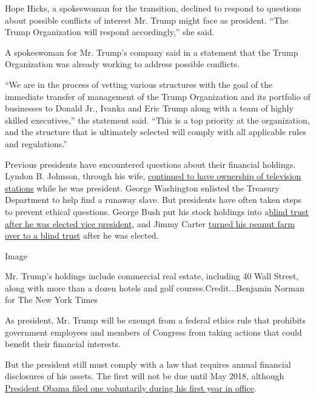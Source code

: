 Hope Hicks, a spokeswoman for the transition, declined to respond to
questions about possible conflicts of interest Mr. Trump might face as
president. ``The Trump Organization will respond accordingly,'' she
said.

A spokeswoman for Mr. Trump's company said in a statement that the Trump
Organization was already working to address possible conflicts.

``We are in the process of vetting various structures with the goal of
the immediate transfer of management of the Trump Organization and its
portfolio of businesses to Donald Jr., Ivanka and Eric Trump along with
a team of highly skilled executives,'' the statement said. ``This is a
top priority at the organization, and the structure that is ultimately
selected will comply with all applicable rules and regulations.''

Previous presidents have encountered questions about their financial
holdings. Lyndon B. Johnson, through his wife,
\href{https://books.google.com/books?id=K7YEteQuN3IC\&pg=PA88\&dq=\%22because+ktbc+was+purchased+in+his+wife\%27s+name\%22\&hl=en\&sa=X\&ved=0ahUKEwiKiJnm46jQAhWDRyYKHWY2DREQ6AEIHTAA\#v=onepage\&q=\%22because\%20ktbc\%20was\%20purchased\%20in\%20his\%20wife's\%20name\%22\&f=false}{continued
to have ownership of television stations} while he was president. George
Washington enlisted the Treasury Department to help find a runaway
slave. But presidents have often taken steps to prevent ethical
questions. George Bush put his stock holdings into
a\href{http://www.nytimes.com/1988/06/06/us/bush-easily-a-millionaire-but-the-growth-was-slow.html?pagewanted=all}{blind
trust after he was elected vice president}, and Jimmy Carter
\href{http://www.nytimes.com/1977/01/05/archives/texts-of-carter-statement-on-conflicts-of-interest-and-ethics.html}{turned
his peanut farm over to a blind trust} after he was elected.

Image

Mr. Trump's holdings include commercial real estate, including 40 Wall
Street, along with more than a dozen hotels and golf
courses.Credit...Benjamin Norman for The New York Times

As president, Mr. Trump will be exempt from a federal ethics rule that
prohibits government employees and members of Congress from taking
actions that could benefit their financial interests.

But the president still must comply with a law that requires annual
financial disclosures of his assets. The first will not be due until May
2018, although
\href{https://www.whitehouse.gov/blog/2009/05/15/president-obama-and-vice-president-bidens-personal-financial-disclosures-now-availab}{President
Obama filed one voluntarily during his first year in office}.

